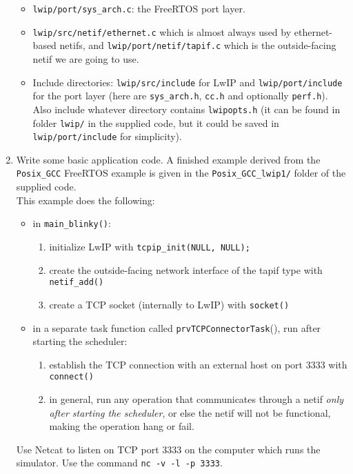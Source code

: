 \begin{enumerate}
\begin{itemize}
        \item \texttt{lwip/port/sys\_arch.c}: the FreeRTOS port layer.
        \item \texttt{lwip/src/netif/ethernet.c} which is almost always used by ethernet-based netifs, and \texttt{lwip/port/netif/tapif.c} which is the outside-facing netif we are going to use.
        \item Include directories: \texttt{lwip/src/include} for LwIP and \texttt{lwip/port/include} for the port layer (here are \texttt{sys\_arch.h}, \texttt{cc.h} and optionally \texttt{perf.h}). Also include whatever directory contains \texttt{lwipopts.h} (it can be found in folder \texttt{lwip/} in the supplied code, but it could be saved in \texttt{lwip/port/include} for simplicity).
    \end{itemize}
    \item Write some basic application code. A finished example derived from the \texttt{Posix\_GCC} FreeRTOS example is given in the \texttt{Posix\_GCC\_lwip1/} folder of the supplied code.\\
    This example does the following:
    \begin{itemize}
        \item in \texttt{main\_blinky()}:
        \begin{enumerate}
            \item initialize LwIP with \texttt{tcpip\_init(NULL, NULL);}
            \item create the outside-facing network interface of the tapif type with \texttt{netif\_add()}
            \item create a TCP socket (internally to LwIP) with \texttt{socket()}
        \end{enumerate}
    
        \item in a separate task function called \texttt{prvTCPConnectorTask}(), run after starting the scheduler:
        \begin{enumerate}
            \item establish the TCP connection with an external host on port 3333 with \texttt{connect()}
			\item in general, run any operation that communicates through a netif \textit{only after starting the scheduler}, or else the netif will not be functional, making the operation hang or fail.
        \end{enumerate}
    \end{itemize}
    Use Netcat to listen on TCP port 3333 on the computer which runs the simulator. Use the command \texttt{nc -v -l -p 3333}.
\end{enumerate}

